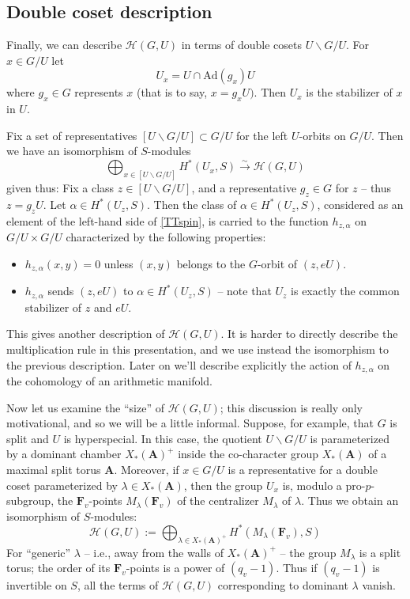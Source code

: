 \documentclass[10pt]{amsart}
\newcommand{\Ad}{\mathrm{Ad}}
\theoremstyle{remark}
\begin{document}
     \subsection{Double coset description} \label{doublecoset}
     Finally, we can describe $\mathscr{H}(G, U)$ in terms of double cosets 
     $U \backslash G/U$. 
 For $x \in G/U$ let   $$U_x = U \cap \Ad(g_x) U$$ where $g_x \in G$
represents $x$ (that is to say, $x=g_x U)$. Then $U_x$ is the stabilizer of $x$ in $U$. 

Fix a set of representatives $[U \backslash G/U] \subset G/U$
for the  left $U$-orbits on $G/U$. 
Then we have an isomorphism of $S$-modules
\begin{equation} \label{TTspin} \bigoplus_{x \in [U \backslash G/U]}   H^*(U_x, S) \stackrel{\sim}{\rightarrow} \mathscr{H}(G,U) \end{equation} 
 given thus:   Fix a class $z \in   [U \backslash G/U]$,   and a representative $g_z\in G$ for $z$ -- thus $z = g_z U$. Let $\alpha \in H^*(U_z, S)$. 
  Then the class of $\alpha \in H^*(U_z, S)$, considered as an element of the left-hand side of \eqref{TTspin},
  is carried to the function $h_{z,\alpha} $ on   $G/U \times G/U$ characterized by the following properties:
  \begin{itemize}
  \item[(i)]$h_{z,\alpha}(x,y) = 0$ unless    $(x, y) $ belongs to the $G$-orbit of $(z, eU)$. 
  \item[(ii)]  $h_{z,\alpha}$ sends   $ (z, eU) $ to $\alpha \in H^*(U_z,S)$ -- note that $U_z$ is exactly the common stabilizer of $z$ and $eU$.
  \end{itemize}
  
   This gives another description of $\mathscr{H}(G, U)$. It is harder to directly describe the multiplication rule in this presentation, and we use instead the isomorphism to the previous description. 
  Later on we'll describe explicitly the action of $h_{z,\alpha}$ on the cohomology of an arithmetic manifold. 
 
  Now let us examine the ``size'' of $\mathscr{H}(G, U)$; this discussion is  really only motivational, and so we will be a little informal. Suppose, for example,
 that $G$ is split and $U$ is hyperspecial. In this case, the quotient $U \backslash G/U$
 is parameterized by a dominant chamber  $X_*(\mathbf{A})^+$ inside the co-character group $X_*(\mathbf{A})$ of a maximal split torus $\mathbf{A}$. 
 Moreover, if $x \in G/U$  is a representative for a double coset parameterized by $\lambda \in X_*(\mathbf{A})$, then the group $U_x$ is, modulo a pro-$p$-subgroup, 
 the $\mathbf{F}_v$-points $M_{\lambda}(\mathbf{F}_v)$ of the   centralizer $M_{\lambda}$ of $\lambda$. 
 Thus we obtain an isomorphism of $S$-modules:
 $$\mathscr{H}(G, U) := \bigoplus_{\lambda \in X_*(\mathbf{A})^+}  H^*(M_{\lambda}(\mathbf{F}_v), S)$$
For ``generic'' $\lambda$ -- i.e., away from the walls of $X_*(\mathbf{A})^+$ --
the group
$M_{\lambda}$ is a split torus; the order of its $\mathbf{F}_v$-points is a power   of $(q_v-1)$.  Thus if $(q_v-1)$ is invertible on $S$, 
all the terms of $\mathscr{H}(G, U)$ corresponding to dominant $\lambda$ vanish.
\end{document}
